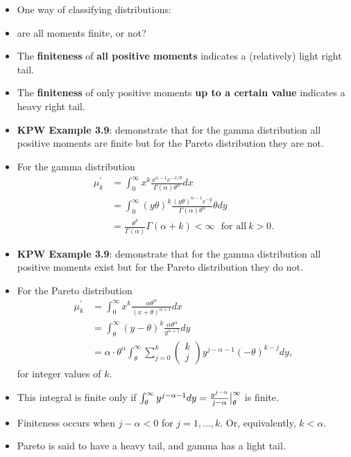 \documentclass[]{book}
\theoremstyle{definition}
\theoremstyle{definition}
\theoremstyle{definition}
\theoremstyle{remark}
\begin{document}
\begin{itemize}
\item
  One way of classifying distributions:
\item
  are all moments finite, or not?
\item
  The \textbf{finiteness} of \textbf{all positive moments} indicates a
  (relatively) light right tail.
\item
  The \textbf{finiteness} of only positive moments \textbf{up to a
  certain value} indicates a heavy right tail.
\item
  \textbf{KPW Example 3.9}: demonstrate that for the gamma distribution
  all positive moments are finite but for the Pareto distribution they
  are not.
\item
  For the gamma distribution \[\begin{aligned}
  \mu_k^{'} &= \int_0^{\infty} x^k \frac{x^{\alpha-1} e^{-x/\theta}}{\Gamma(\alpha) \theta^{\alpha}} dx \\
  &= \int_0^{\infty} (y\theta)^k  \frac{(y\theta)^{\alpha-1} e^{-y}}{\Gamma(\alpha) \theta^{\alpha}} \theta dy \\
  &= \frac{\theta^k}{\Gamma(\alpha)} \Gamma(\alpha+k) < \infty \ \ \ \text{for\ all}\ k>0.\end{aligned}\]
\item
  \textbf{KPW Example 3.9}: demonstrate that for the gamma distribution
  all positive moments exist but for the Pareto distribution they do
  not.
\item
  For the Pareto distribution \[\begin{aligned}
  \mu_k^{'} &= \int_0^{\infty} x^k \frac{\alpha \theta^{\alpha}}{(x+\theta)^{\alpha+1}} dx \\
  &= \int_{\theta}^{\infty} (y-\theta)^k \frac{\alpha \theta^{\alpha}}{y^{\alpha+1}} dy \\
  &= \alpha \cdot \theta^{\alpha} \int_{\theta}^{\infty} \sum_{j=0}^k \left(\begin{array}{c}
   k \\
   j
   \end{array} \right) y^{j-\alpha-1} (-\theta)^{k-j} dy,\end{aligned}\]
  for integer values of \(k\).
\item
  This integral is finite only if
  \(\int_{\theta}^{\infty} y^{j-\alpha-1} dy = \frac{y^{j-\alpha}}{j-\alpha}\big{|}_{\theta}^{\infty}\)
  is finite.
\item
  Finiteness occurs when \(j-\alpha < 0\) for \(j=1, \ldots,k\). Or,
  equivalently, \(k< \alpha\).
\item
  Pareto is said to have a heavy tail, and gamma has a light tail.
\end{itemize}
\end{document}
